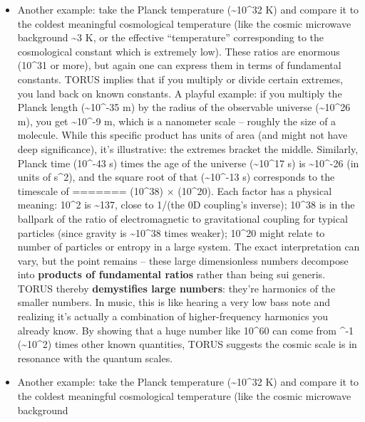 \documentclass[]{article}
\begin{document}
{\begin{itemize}
  known quantities, TORUS suggests the cosmic scale is in resonance with
  the quantum scales\hspace{0pt}.
\item
  Another example: take the Planck temperature (\textasciitilde10\^{}32
  K) and compare it to the coldest meaningful cosmological temperature
  (like the cosmic microwave background \textasciitilde3 K, or the
  effective ``temperature'' corresponding to the cosmological constant
  which is extremely low). These ratios are enormous (10\^{}31 or more),
  but again one can express them in terms of fundamental constants.
  TORUS implies that if you multiply or divide certain extremes, you
  land back on known constants. A playful example: if you multiply the
  Planck length (\textasciitilde10\^{}-35 m) by the radius of the
  observable universe (\textasciitilde10\^{}26 m), you get
  \textasciitilde10\^{}-9 m, which is a nanometer scale -- roughly the
  size of a molecule. While this specific product has units of area (and
  might not have deep significance), it's illustrative: the extremes
  bracket the middle. Similarly, Planck time (10\^{}-43 s) times the age
  of the universe (\textasciitilde10\^{}17 s) is
  \textasciitilde10\^{}-26 (in units of s\^{}2), and the square root of
  that (\textasciitilde10\^{}-13 s) corresponds to the timescale of
=======
  (10\^{}38) × (10\^{}20)​. Each factor has a physical meaning: 10\^{}2
  is \textasciitilde{}137, close to 1/\alpha (the 0D coupling's inverse)​;
  10\^{}38 is in the ballpark of the ratio of electromagnetic to
  gravitational coupling for typical particles (since gravity is
  \textasciitilde{}10\^{}38 times weaker)​; 10\^{}20 might relate to
  number of particles or entropy in a large system. The exact
  interpretation can vary, but the point remains -- these large
  dimensionless numbers decompose into \textbf{products of fundamental
  ratios} rather than being sui generis. TORUS thereby
  \textbf{demystifies large numbers}: they're harmonics of the smaller
  numbers. In music, this is like hearing a very low bass note and
  realizing it's actually a combination of higher-frequency harmonics
  you already know. By showing that a huge number like 10\^{}60 can come
  from \alpha\^{}-1 (\textasciitilde{}10\^{}2) times other known quantities,
  TORUS suggests the cosmic scale is in resonance with the quantum
  scales​.
\item
  Another example: take the Planck temperature
  (\textasciitilde{}10\^{}32 K) and compare it to the coldest meaningful
  cosmological temperature (like the cosmic microwave background

\end{itemize}}
\end{document}
